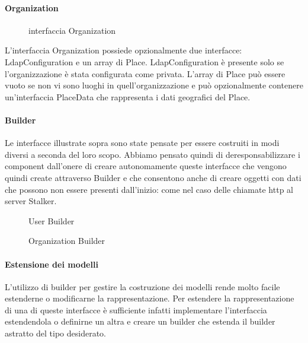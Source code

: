 \documentclass[../../manuale-manutentore.tex]{subfiles}
\begin{document}
\paragraph{Organization}%
\label{par:webapp/organization}
\begin{figure}[H]
  \centering
  \caption{interfaccia Organization}%
  \label{fig:web-app-organization}
\end{figure}
L'interfaccia Organization possiede opzionalmente due interfacce: LdapConfiguration e un array di Place.
LdapConfiguration è presente solo se l'organizzazione è stata configurata come privata.
L'array di Place può essere vuoto se non vi sono luoghi in quell'organizzazione e può opzionalmente contenere un'interfaccia PlaceData che rappresenta i dati geografici del Place.

\paragraph{Builder}%
\label{par:builder}
Le interfacce illustrate sopra sono state pensate per essere costruiti in modi diversi a seconda del loro scopo.
Abbiamo pensato quindi di deresponsabilizzare i component dall'onere di creare autonomamente queste interfacce che vengono quindi create attraverso Builder e che consentono anche di creare oggetti con dati che possono non essere presenti dall'inizio: come nel caso delle chiamate http al server Stalker.
\begin{figure}[H]
  \centering
  \caption{User Builder}%
  \label{fig:web-app-user-builder}
\end{figure}
\begin{figure}[H]
  \centering
  \caption{Organization Builder}%
  \label{fig:web-app-organization-builder}
\end{figure}

\paragraph{Estensione dei modelli}%
\label{par:estensione_interfacce_webapp}

L'utilizzo di builder per gestire la costruzione dei modelli rende molto facile estenderne o modificarne la rappresentazione.
Per estendere la rappresentazione di una di queste interfacce è sufficiente infatti implementare l'interfaccia estendendola o definirne un altra e creare un builder che estenda il builder astratto del tipo desiderato.
\end{document}
